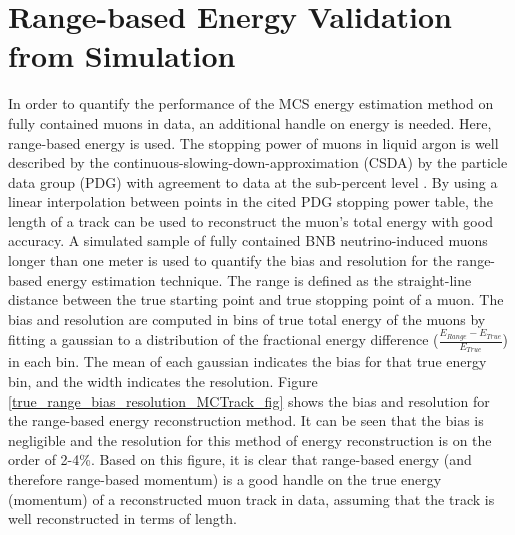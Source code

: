 \documentclass[a4paper,11pt]{article}
\begin{document}
\section{Range-based Energy Validation from Simulation}\label{Range_Energy_Validation_section}
In order to quantify the performance of the MCS energy estimation method on fully contained muons in data, an additional handle on energy is needed. Here, range-based energy is used. The stopping power of muons in liquid argon is well described by the continuous-slowing-down-approximation (CSDA) by the particle data group (PDG) with agreement to data at the sub-percent level \cite{MIPenergysource} \cite{PDG_spline_table} \cite{NISTdata}. By using a linear interpolation between points in the cited PDG stopping power table, the length of a track can be used to reconstruct the muon's total energy with good accuracy. A simulated sample of fully contained BNB neutrino-induced muons longer than one meter is used to quantify the bias and resolution for the range-based energy estimation technique. The range is defined as the straight-line distance between the true starting point and true stopping point of a muon. The bias and resolution are computed in bins of true total energy of the muons by fitting a gaussian to a distribution of the fractional energy difference ($\frac{E_{Range}-E_{True}}{E_{True}}$) in each bin. The mean of each gaussian indicates the bias for that true energy bin, and the width indicates the resolution. Figure \ref{true_range_bias_resolution_MCTrack_fig} shows the bias and resolution for the range-based energy reconstruction method. It can be seen that the bias is negligible and the resolution for this method of energy reconstruction is on the order of 2-4\%. Based on this figure, it is clear that range-based energy (and therefore range-based momentum) is a good handle on the true energy (momentum) of a reconstructed muon track in data, assuming that the track is well reconstructed in terms of length.
\end{document}
